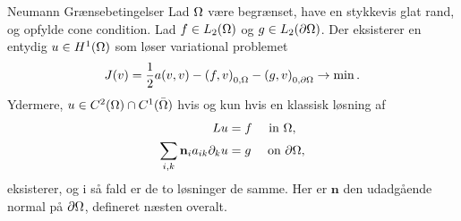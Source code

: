 \begin{frame}{Neumann Grænsebetingelser}{}
    Lad $\Omega$ være begrænset, have en stykkevis glat rand, og opfylde cone condition. Lad $f \in L_2(\Omega)$ og $g\in L_2(\partial \Omega)$. Der eksisterer en entydig $u \in H^1(\Omega)$ som løser variational problemet
    \begin{equation*}
     J(v) = \frac{1}{2}a(v,v) - {(f,v)}_{0,\Omega} - {(g,v)}_{0,\partial\Omega} \to \min.
    \end{equation*}
    Ydermere, $u \in C^2(\Omega)\cap C^1(\bar{\Omega})$ hvis og kun hvis en klassisk løsning af
    \begin{align}
     Lu &= f \quad \text{ in }\Omega, \nonumber \\
     \sum_{i,k}  \mathbf{n}_i a_{ik} \partial_k u &= g \quad \text{ on } \partial \Omega, \label{eq:neuman_condition_boundary}
    \end{align}
    eksisterer, og i så fald er de to løsninger de samme. Her er $\mathbf{n}$ den udadgående normal på $\partial \Omega$, defineret næsten overalt.
\end{frame}